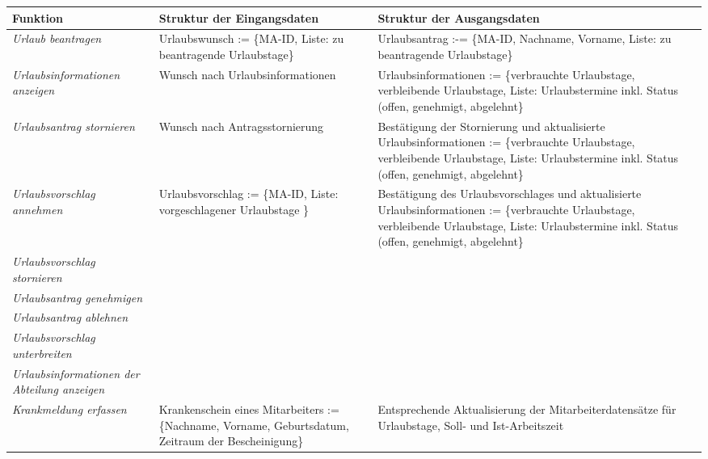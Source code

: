 \newpage
\thispagestyle{empty}
{
\vspace{0.7cm}
\hspace{-2cm}
\footnotesize
\begin{tabular}{|p{3cm}|p{6cm}|p{6cm}|}
	\hline
		\textbf{Funktion	} &	
		\textbf{Struktur der Eingangsdaten} &
		\textbf{Struktur der Ausgangsdaten} \\
	\hline \hline		
	\textit{Urlaub beantragen} &
		Urlaubswunsch := \{MA-ID, Liste: zu beantragende Urlaubstage\}&
		Urlaubsantrag :-= \{MA-ID, Nachname, Vorname, Liste: zu beantragende Urlaubstage\}\\
	\hline
		\textit{Urlaubsinformationen anzeigen} &
		Wunsch nach Urlaubsinformationen &
		Urlaubsinformationen := \{verbrauchte Urlaubstage, verbleibende Urlaubstage, Liste: Urlaubstermine inkl. Status (offen, genehmigt, abgelehnt\}\\
	\hline		
		\textit{Urlaubsantrag \newline stornieren} &
		Wunsch nach Antragsstornierung &
		Best\"atigung der Stornierung und aktualisierte Urlaubsinformationen := \{verbrauchte Urlaubstage, verbleibende Urlaubstage, Liste: Urlaubstermine inkl. Status (offen, genehmigt, abgelehnt\}\\
	\hline
		\textit{Urlaubsvorschlag \newline annehmen} &
		Urlaubsvorschlag := \{MA-ID, Liste: vorgeschlagener Urlaubstage \}&
		Best\"atigung des Urlaubsvorschlages und aktualisierte Urlaubsinformationen := \{verbrauchte Urlaubstage, verbleibende Urlaubstage, Liste: Urlaubstermine inkl. Status (offen, genehmigt, abgelehnt\}\\
	\hline
		\textit{Urlaubsvorschlag \newline stornieren} &
		&
		\\
	\hline \hline
		\textit{Urlaubsantrag \newline genehmigen} &
		&
		\\
	\hline
		\textit{Urlaubsantrag \newline ablehnen} &
		&
		\\
	\hline
		\textit{Urlaubsvorschlag \newline unterbreiten} &
		&
		\\
	\hline
		\textit{Urlaubsinformationen der Abteilung anzeigen} &
		&
		\\
	\hline \hline
		\textit{Krankmeldung erfassen} &
		Krankenschein eines \newline Mitarbeiters := \{Nachname, Vorname, Geburtsdatum, Zeitraum der Bescheinigung\} &
		Entsprechende Aktualisierung der Mitarbeiterdatens\"atze f\"ur Urlaubstage, Soll- und Ist-Arbeitszeit \\

\end{tabular}}
